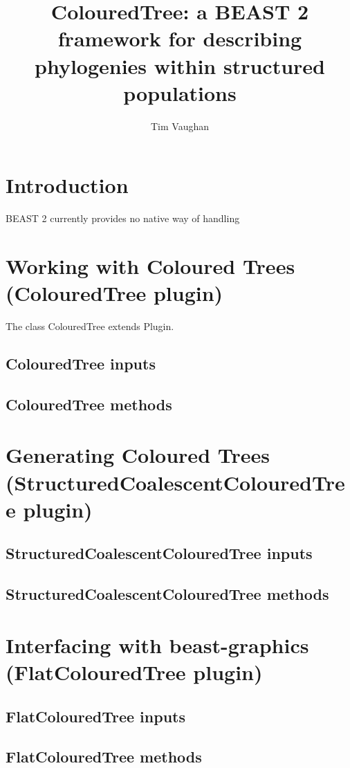 \documentclass[a4paper,11pt]{paper}
\title{ColouredTree: a BEAST 2 framework for describing
phylogenies within structured populations}
\author{Tim Vaughan}
\newcommand{\class}[1]{\textsf{#1}}
\begin{document}
\maketitle

\section{Introduction}

BEAST 2 currently provides no native way of handling 

\section{Working with Coloured Trees (ColouredTree plugin)}

The class \class{ColouredTree} extends \class{Plugin}.

\subsection{ColouredTree inputs}

\subsection{ColouredTree methods}

\section{Generating Coloured Trees (StructuredCoalescentColouredTree plugin)}

\subsection{StructuredCoalescentColouredTree inputs}
\subsection{StructuredCoalescentColouredTree methods}

\section{Interfacing with {\textsf beast-graphics} (FlatColouredTree plugin)}

\subsection{FlatColouredTree inputs}
\subsection{FlatColouredTree methods}
\end{document}
